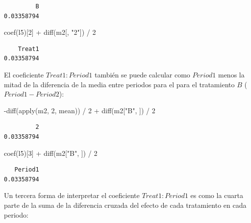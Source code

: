 \documentclass[
  12pt,
  a4paper,
  extrafontsizes,
  onecolumn,
  openright]{memoir}
\newenvironment{Shaded}{\begin{snugshade}}{\end{snugshade}}
\newcommand{\DecValTok}[1]{\textcolor[rgb]{0.68,0.00,0.00}{#1}}
\newcommand{\FunctionTok}[1]{\textcolor[rgb]{0.28,0.35,0.67}{#1}}
\newcommand{\NormalTok}[1]{\textcolor[rgb]{0.00,0.23,0.31}{#1}}
\newcommand{\SpecialCharTok}[1]{\textcolor[rgb]{0.37,0.37,0.37}{#1}}
\newcommand{\StringTok}[1]{\textcolor[rgb]{0.13,0.47,0.30}{#1}}
\begin{document}
\begin{verbatim}
         B 
0.03358794 
\end{verbatim}

\begin{Shaded}
\begin{Highlighting}[]
\FunctionTok{coef}\NormalTok{(l5)[}\DecValTok{2}\NormalTok{] }\SpecialCharTok{+} \FunctionTok{diff}\NormalTok{(m2[, }\StringTok{"2"}\NormalTok{]) }\SpecialCharTok{/} \DecValTok{2}
\end{Highlighting}
\end{Shaded}

\begin{verbatim}
    Treat1 
0.03358794 
\end{verbatim}

\normalsize

El coeficiente \(Treat1:Period1\) también se puede calcular como
\(Period1\) menos la mitad de la diferencia de la media entre periodos
para el para el tratamiento \(B\) (\(Period1-Period2\)):

\scriptsize

\begin{Shaded}
\begin{Highlighting}[]
\SpecialCharTok{{-}}\FunctionTok{diff}\NormalTok{(}\FunctionTok{apply}\NormalTok{(m2, }\DecValTok{2}\NormalTok{, mean)) }\SpecialCharTok{/} \DecValTok{2} \SpecialCharTok{+} \FunctionTok{diff}\NormalTok{(m2[}\StringTok{"B"}\NormalTok{, ]) }\SpecialCharTok{/} \DecValTok{2}
\end{Highlighting}
\end{Shaded}

\begin{verbatim}
         2 
0.03358794 
\end{verbatim}

\begin{Shaded}
\begin{Highlighting}[]
\FunctionTok{coef}\NormalTok{(l5)[}\DecValTok{3}\NormalTok{] }\SpecialCharTok{+} \FunctionTok{diff}\NormalTok{(m2[}\StringTok{"B"}\NormalTok{, ]) }\SpecialCharTok{/} \DecValTok{2}
\end{Highlighting}
\end{Shaded}

\begin{verbatim}
   Period1 
0.03358794 
\end{verbatim}

\normalsize

Un tercera forma de interpretar el coeficiente \(Treat1:Period1\) es
como la cuarta parte de la suma de la diferencia cruzada del efecto de
cada tratamiento en cada periodo:
\end{document}
